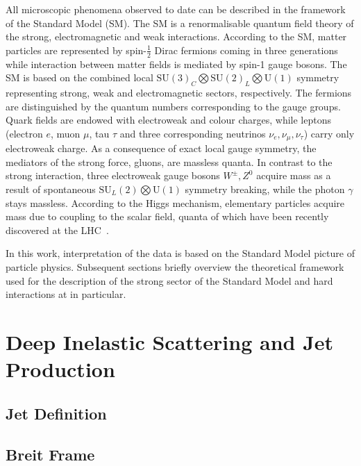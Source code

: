 All microscopic phenomena observed to date can be described in the framework of the Standard Model (SM). The SM is a renormalisable quantum field theory of the strong, electromagnetic and weak interactions. According to the SM, matter particles are represented by spin-$\frac{1}{2}$ Dirac fermions coming in three generations while interaction between matter fields is mediated by spin-1 gauge bosons. The SM is based on the combined local $\mathrm{SU}\left(3\right)_{C} \bigotimes \mathrm{SU}\left(2\right)_{L} \bigotimes \mathrm{U}\left(1\right)$ symmetry representing strong, weak and electromagnetic sectors, respectively. The fermions are distinguished by the quantum numbers corresponding to the gauge groups. Quark fields are endowed with electroweak and colour charges, while leptons (electron $e$, muon $\mu$, tau $\tau$ and three corresponding neutrinos $\nu_e, \nu_\mu, \nu_\tau$) carry only electroweak charge. As a consequence of exact local gauge symmetry, the mediators of the strong force, gluons, are massless quanta. In contrast to the strong interaction, three electroweak gauge bosons $W^\pm, Z^0$ acquire mass as a result of spontaneous $\mathrm{SU}_{L}\left(2\right) \bigotimes \mathrm{U}\left(1\right)$ symmetry breaking, while the photon $\gamma$ stays massless. According to the Higgs mechanism, elementary particles acquire mass due to coupling to the scalar field, quanta of which have been recently discovered at the LHC~\cite{pl:b716:1,pl:b716:30}.

In this work, interpretation of the data is based on the Standard Model picture of particle physics. Subsequent sections briefly overview the theoretical framework used for the description of the strong sector of the Standard Model and hard interactions at \hera in particular.

\section{Deep Inelastic Scattering and Jet Production}
\label{sec:kindis}


\subsection{Jet Definition}
\label{sec:jetalgo}


\subsection{Breit Frame}
\label{subsec:breitframe}


